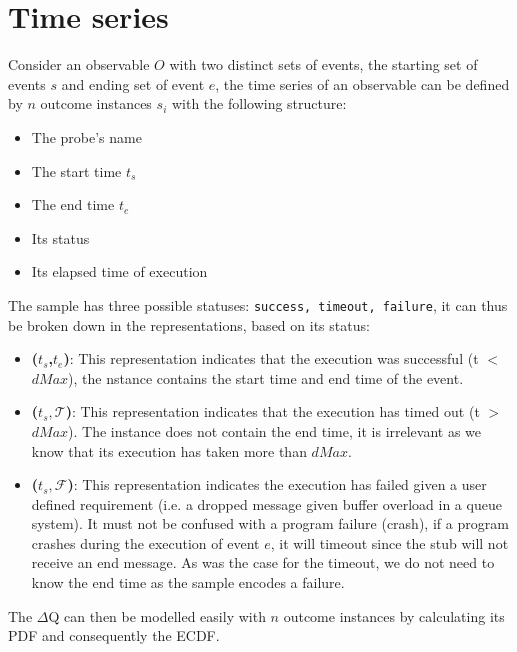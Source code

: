 \section{Time series}
    Consider an observable $O$ with two distinct sets of events, the starting set of events $s$ and ending set of event $e$, the time series of an observable can be defined by $n$ outcome instances $s_i$ with the following structure:
    \begin{itemize}
        \item The probe's name
        \item The start time $t_s$
        \item The end time $t_e$
        \item Its status 
        \item Its elapsed time of execution
    \end{itemize}
    The sample has three possible statuses: \texttt{success, timeout, failure}, it can thus be broken down in the representations, based on its status:
    \begin{itemize}
        \item \textbf{($t_s$,$t_e$)}: This representation indicates that the execution was successful (t $<$ $dMax$), the nstance contains the start time and end time of the event.
        \item \textbf{($t_s, \mathcal{T}$)}: This representation indicates that the execution has timed out (t $>$ $dMax$). The instance does not contain the end time, it is irrelevant as we know that its execution has taken more than $dMax$.
            \item \textbf{($t_s, \mathcal{F}$)}: This representation indicates the execution has failed given a user defined requirement (i.e. a dropped message given buffer overload in a queue system). It must not be confused with a program failure (crash), if a program crashes during the execution of event $e$, it will timeout since the stub will not receive an end message. As was the case for the timeout, we do not need to know the end time as the sample encodes a failure.
    \end{itemize}
    The $\Delta$Q can then be modelled easily with $n$ outcome instances by calculating its PDF and consequently the ECDF.
